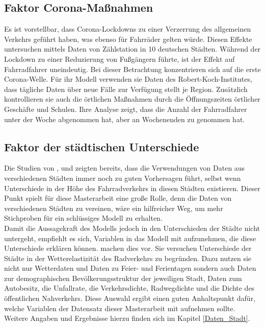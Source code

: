 \documentclass[a4paper,12pt]{thesis}
\begin{document}
\subsection{Faktor Corona-Maßnahmen}

Es ist vorstellbar, dass Corona-Lockdowns zu einer Verzerrung des allgemeinen Verkehrs geführt haben, was ebenso für Fahrräder gelten würde. Diesen Effekte untersuchen \cite{Moellers2021} mittels Daten von Zählstation in 10 deutschen Städten. Während der Lockdown zu einer Reduzierung von Fußgängern führte, ist der Effekt auf Fahrradfahrer uneindeutig. Bei dieser Betrachtung konzentrieren sich \cite{Moellers2021} auf die erste Corona-Welle. Für ihr Modell verwenden sie Daten des Robert-Koch-Institutes, dass tägliche Daten über neue Fälle zur Verfügung stellt je Region. Zusätzlich kontrollieren sie auch die örtlichen Maßnahmen durch die Öffnungszeiten örtlicher Geschäfte und Schulen. Ihre Analyse zeigt, dass die Anzahl der Fahrradfahrer unter der Woche abgenommen hat, aber an Wochenenden zu genommen hat.

\subsection{Faktor der städtischen Unterschiede}\label{Faktor_Stadt}

Die Studien von \cite{Wessel2020}, \cite{Moellers2021} und \cite{Goldmann2021} zeigten bereits, dass die Verwendungen von Daten aus verschiedenen Städten immer noch zu guten Vorhersagen führt, selbst wenn Unterschiede in der Höhe des Fahrradverkehrs in diesen Städten existieren. Dieser Punkt spielt für diese Masterarbeit eine große Rolle, denn die Daten von verschiedenen Städten zu vereinen, wäre ein hilfreicher Weg, um mehr Stichproben für ein schlüssiges Modell zu erhalten.\\
Damit die Aussagekraft des Modells jedoch in den Unterschieden der Städte nicht untergeht, empfiehlt es sich, Variablen in das Modell mit aufzunehmen, die diese Unterschiede erklären können. \cite{Goldmann2021} machen dies vor. Sie versuchen Unterschiede der Städte in der Wetterelastizität des Radverkehrs zu begründen. Dazu nutzen sie nicht nur Wetterdaten und Daten zu Feier- und Ferientagen sondern auch Daten zur demographischen Bevölkerungsstruktur der jeweiligen Stadt, Daten zum Autobesitz, die Unfallrate, die Verkehrsdichte, Radwegdichte und die Dichte des öffentlichen Nahverkehrs. Diese Auswahl ergibt einen guten Anhaltspunkt dafür, welche Variablen der Datensatz dieser Masterarbeit mit aufnehmen sollte. Weitere Angaben und Ergebnisse hierzu finden sich im Kapitel \ref{Daten_Stadt}.
\end{document}

